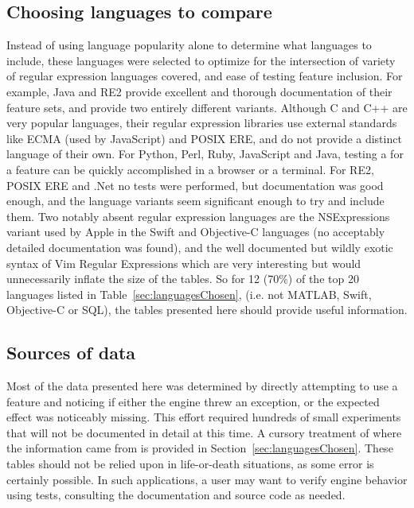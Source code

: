 \subsection*{Choosing languages to compare}
\label{sec:languagesChosen}
Instead of using language popularity alone to determine what languages to include, these languages were selected to optimize for the intersection of variety of regular expression languages covered, and ease of testing feature inclusion.  For example, Java and RE2 provide excellent and thorough documentation of their feature sets, and provide two entirely different variants.  Although C and C++ are very popular languages, their regular expression libraries use external standards like ECMA (used by JavaScript) and POSIX ERE, and do not provide a distinct language of their own.  For Python, Perl, Ruby, JavaScript and Java, testing a for a feature can be quickly accomplished in a browser or a terminal.  For RE2, POSIX ERE and .Net no tests were performed, but documentation was good enough, and the language variants seem significant enough to try and include them.  Two notably absent regular expression languages are the NSExpressions variant used by Apple in the Swift and Objective-C languages (no acceptably detailed documentation was found), and the well documented but wildly exotic syntax of Vim Regular Expressions which are very interesting but would unnecessarily inflate the size of the tables. So for 12 (70\%) of the top 20 languages listed in Table~\ref{sec:languagesChosen}, (i.e. not MATLAB, Swift, Objective-C or SQL), the tables presented here should provide useful information.

\subsection*{Sources of data}
\label{sec:sourcesAndTechniques}
Most of the data presented here was determined by directly attempting to use a feature and noticing if either the engine threw an exception, or the expected effect was noticeably missing.  This effort required hundreds of small experiments that will not be documented in detail at this time.  A cursory treatment of where the information came from is provided in Section~\ref{sec:languagesChosen}.  These tables should not be relied upon in life-or-death situations, as some error is certainly possible.  In such applications, a user may want to verify engine behavior using tests, consulting the documentation and source code as needed.



